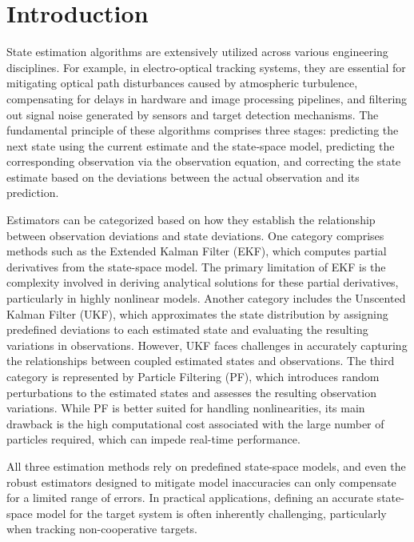 \documentclass[sn-nature]{sn-jnl}%
\theoremstyle{thmstyleone}%
\theoremstyle{thmstyletwo}%
\theoremstyle{thmstylethree}%
\begin{document}

\maketitle

\section{Introduction}\label{sec1}

State estimation algorithms are extensively utilized across various engineering disciplines. For example, in electro-optical tracking systems, they are essential for mitigating optical path disturbances caused by atmospheric turbulence, compensating for delays in hardware and image processing pipelines, and filtering out signal noise generated by sensors and target detection mechanisms. The fundamental principle of these algorithms comprises three stages: predicting the next state using the current estimate and the state‐space model, predicting the corresponding observation via the observation equation, and correcting the state estimate based on the deviations between the actual observation and its prediction.

Estimators can be categorized based on how they establish the relationship between observation deviations and state deviations. One category comprises methods such as the Extended Kalman Filter (EKF), which computes partial derivatives from the state-space model. The primary limitation of EKF is the complexity involved in deriving analytical solutions for these partial derivatives, particularly in highly nonlinear models. Another category includes the Unscented Kalman Filter (UKF), which approximates the state distribution by assigning predefined deviations to each estimated state and evaluating the resulting variations in observations. However, UKF faces challenges in accurately capturing the relationships between coupled estimated states and observations. The third category is represented by Particle Filtering (PF), which introduces random perturbations to the estimated states and assesses the resulting observation variations. While PF is better suited for handling nonlinearities, its main drawback is the high computational cost associated with the large number of particles required, which can impede real-time performance.

All three estimation methods rely on predefined state-space models, and even the robust estimators designed to mitigate model inaccuracies can only compensate for a limited range of errors. In practical applications, defining an accurate state-space model for the target system is often inherently challenging, particularly when tracking non-cooperative targets.
\end{document}
